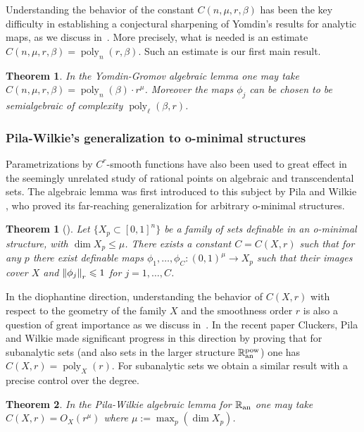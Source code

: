 \documentclass[reqno]{amsart}
\newtheorem{Thm}{Theorem}{\bfseries}{\itshape}
\newtheorem*{Thm*}{Theorem}{\bfseries}{\itshape}
\renewcommand\~[1]{\widetilde{#1}}
\def\poly{\operatorname{poly}} \def\J{\operatorname{J}}
\def\an{{\text{an}}}
\begin{document}
Understanding the behavior of the constant $C(n,\mu,r,\beta)$ has been
the key difficulty in establishing a conjectural sharpening of
Yomdin's results for analytic maps, as we discuss
in~. More precisely, what is needed is an
estimate $C(n,\mu,r,\beta)=\poly_n(r,\beta)$. Such an estimate is our
first main result.

\begin{Thm}
  In the Yomdin-Gromov algebraic lemma one may take
  $C(n,\mu,r,\beta)=\poly_n(\beta)\cdot r^\mu$. Moreover the maps
  $\phi_j$ can be chosen to be semialgebraic of complexity
  $\poly_\ell(\beta,r)$.
\end{Thm}

\subsubsection{Pila-Wilkie's generalization to o-minimal structures}

Parametrizations by $C^r$-smooth functions have also been used to
great effect in the seemingly unrelated study of rational points on
algebraic and transcendental sets. The algebraic lemma was first
introduced to this subject by Pila and Wilkie \cite{pila-wilkie}, who
proved its far-reaching generalization for arbitrary o-minimal
structures.

\begin{Thm*}[]\label{thm:yg-pw}
  Let $\{X_p\subset[0,1]^n\}$ be a family of sets definable in an
  o-minimal structure, with $\dim X_p\le\mu$. There exists a constant
  $C=C(X,r)$ such that for any $p$ there exist
  definable maps $\phi_1,\ldots,\phi_C:(0,1)^\mu\to X_p$ such that their
  images cover $X$ and $\left\Vert \phi_j \right\Vert_r\leqslant 1$ for $j=1,\ldots,C$.
\end{Thm*}

In the diophantine direction, understanding the behavior of $C(X,r)$
with respect to the geometry of the family $X$ and the smoothness
order $r$ is also a question of great importance as we discuss
in~. In the recent paper \cite{cpw:params}
Cluckers, Pila and Wilkie made significant progress in this direction
by proving that for subanalytic sets (and also sets in the larger
structure $\R_\an^{\text{pow}}$) one has $C(X,r)=\poly_X(r)$. For
subanalytic sets we obtain a similar result with a precise control
over the degree.

\begin{Thm}
  In the Pila-Wilkie algebraic lemma for $\R_\an$ one may take
  $C(X,r)=O_X(r^\mu)$ where $\mu:=\max_p(\dim X_p)$.
\end{Thm}
\end{document}
